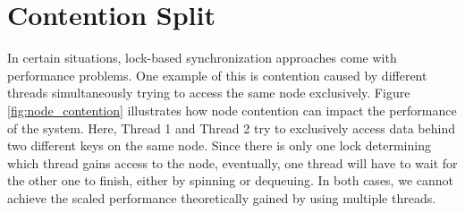 \documentclass[acmlarge,nonacm,dvipsnames]{acmart}
\begin{document}
\section{Contention Split}
In certain situations, lock-based synchronization approaches come with performance problems. One example of this is contention caused by different threads simultaneously trying to access the same node exclusively. Figure \ref{fig:node_contention} illustrates how node contention can impact the performance of the system. Here, Thread 1 and Thread 2 try to exclusively access data behind two different keys on the same node. Since there is only one lock determining which thread gains access to the node, eventually, one thread will have to wait for the other one to finish, either by spinning or dequeuing. In both cases, we cannot achieve the scaled performance theoretically gained by using multiple threads.
\end{document}
